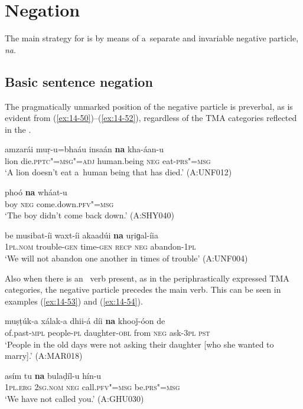 \section{Negation}
\label{sec:14-3}


The main strategy for  is by means of a~separate and invariable negative particle, \textit{na}. 


\subsection{Basic sentence negation}
\label{subsec:14-3-1}


The pragmatically unmarked position of the negative particle is preverbal, as is evident from (\ref{ex:14-50})--(\ref{ex:14-52}), regardless of the TMA categories reflected in the .

\begin{exe}
\ex
\label{ex:14-50}
\gll amzarái muṛ-u=bhaáu insaán \textbf{na} kha-áan-u \\
lion die.\textsc{pptc"=msg"=adj} human.being \textsc{neg} eat-\textsc{prs"=msg} \\
\glt `A lion doesn't eat a~human being that has died.' (A:UNF012)

\ex
\label{ex:14-51}
\gll phoó \textbf{na} wháat-u \\
boy \textsc{neg} come.down.\textsc{pfv"=msg } \\
\glt `The boy didn't come back down.' (A:SHY040)

\ex
\label{ex:14-52}
\gll be musibat-íi waxt-íi akaadúi \textbf{na} uṛiɡal-íia\\
\textsc{1pl.nom} trouble-\textsc{gen} time-\textsc{gen} \textsc{recp} \textsc{neg} abandon-\textsc{1pl}\\
\glt `We will not abandon one another in times of trouble' (A:UNF004)
\end{exe}

Also when there is an~ verb present, as in the periphrastically expressed TMA categories, the negative particle precedes the main verb. This can be seen in examples (\ref{ex:14-53}) and (\ref{ex:14-54}).

\begin{exe}
\ex
\label{ex:14-53}
\gll muṣṭúk-a xálak-a dhii-á díi \textbf{na} khooǰ-óon de \\
of.past-\textsc{mpl} people-\textsc{pl} daughter-\textsc{obl} from \textsc{neg} ask-\textsc{3pl} \textsc{pst}  \\
\glt `People in the old days were not asking their daughter [who she wanted to marry].' (A:MAR018)

\ex
\label{ex:14-54}
\gll asím tu \textbf{na} bulaḍíl-u hín-u \\
\textsc{1pl.erg} \textsc{2sg.nom} \textsc{neg} call.\textsc{pfv"=msg} be.\textsc{prs"=msg} \\
\glt `We have not called you.' (A:GHU030)
\end{exe}

